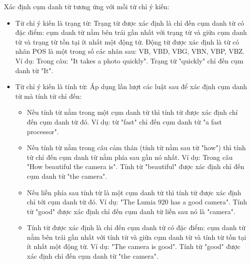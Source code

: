 \documentclass[12pt]{extarticle}
\begin{document}
				\par Xác định cụm danh từ tương ứng với mỗi từ chỉ ý kiến:
				\begin{itemize}
					\item{Từ chỉ ý kiến là trạng từ:
					Trạng từ được xác định là chỉ đến cụm danh từ có đặc điểm: cụm danh từ nằm bên trái gần nhất với trạng từ và giữa cụm danh từ và trạng từ tồn tại ít nhất một động từ. Động từ được xác định là từ có nhãn POS là một trong số các nhãn sau: VB, VBD, VBG, VBN, VBP, VBZ. Ví dụ: Trong câu: "It takes a photo quickly". Trạng từ "quickly" chỉ đến cụm danh từ "It".}
					\item{Từ chỉ ý kiến là tính từ: 
					Áp dụng lần lượt các luật sau để xác định cụm danh từ mà tính từ chỉ đến:
						\begin{itemize}
							\item{Nếu tính từ nằm trong một cụm danh từ thì tính từ được xác định chỉ đến cụm danh từ đó. Ví dụ: từ "fast" chỉ đến cụm danh từ "a fast processor".}
							\item{Nếu tính từ nằm trong câu cảm thán (tính từ nằm sau từ "how") thì tính từ chỉ đến cụm danh từ nằm phía sau gần nó nhất. Ví dụ: Trong câu "How beautiful the camera is". Tính từ "beautiful" được xác định chỉ đến cụm danh từ "the camera".}
							\item{Nếu liền phía sau tính từ là một cụm danh từ thì tính từ được xác định chỉ tới cụm danh từ đó. Ví dụ: "The Lumia 920 has a good camera". Tính từ "good" được xác định chỉ đến cụm danh từ liền sau nó là "camera".}
							\item{Tính từ được xác định là chỉ đến cụm danh từ có đặc điểm: cụm danh từ nằm bên trái gần nhất với tính từ và giữa cụm danh từ và tính từ tồn tại ít nhất một động từ. Ví dụ: "The camera is good". Tính từ "good" được xác định chỉ đến cụm danh từ "the camera".}
						\end{itemize}}
				\end{itemize}
\end{document}
